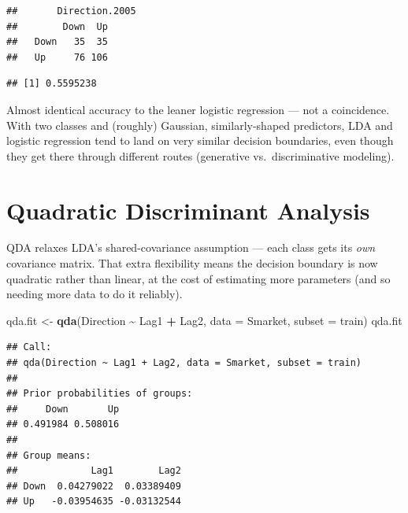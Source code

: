 \documentclass[
  11pt,
]{article}
\newenvironment{Shaded}{\begin{snugshade}}{\end{snugshade}}
\newcommand{\AttributeTok}[1]{\textcolor[rgb]{0.13,0.29,0.53}{#1}}
\newcommand{\FloatTok}[1]{\textcolor[rgb]{0.00,0.00,0.81}{#1}}
\newcommand{\FunctionTok}[1]{\textcolor[rgb]{0.13,0.29,0.53}{\textbf{#1}}}
\newcommand{\NormalTok}[1]{#1}
\newcommand{\OtherTok}[1]{\textcolor[rgb]{0.56,0.35,0.01}{#1}}
\newcommand{\SpecialCharTok}[1]{\textcolor[rgb]{0.81,0.36,0.00}{\textbf{#1}}}
\begin{document}
\begin{verbatim}
##       Direction.2005
##        Down  Up
##   Down   35  35
##   Up     76 106
\end{verbatim}

\begin{Shaded}
\end{Shaded}

\begin{verbatim}
## [1] 0.5595238
\end{verbatim}

Almost identical accuracy to the leaner logistic regression --- not a
coincidence. With two classes and (roughly) Gaussian, similarly-shaped
predictors, LDA and logistic regression tend to land on very similar
decision boundaries, even though they get there through different routes
(generative vs.~discriminative modeling).

\section{Quadratic Discriminant
Analysis}\label{quadratic-discriminant-analysis}

QDA relaxes LDA's shared-covariance assumption --- each class gets its
\emph{own} covariance matrix. That extra flexibility means the decision
boundary is now quadratic rather than linear, at the cost of estimating
more parameters (and so needing more data to do it reliably).

\begin{Shaded}
\begin{Highlighting}[]
\NormalTok{qda.fit }\OtherTok{\textless{}{-}} \FunctionTok{qda}\NormalTok{(Direction }\SpecialCharTok{\textasciitilde{}}\NormalTok{ Lag1 }\SpecialCharTok{+}\NormalTok{ Lag2, }\AttributeTok{data =}\NormalTok{ Smarket, }\AttributeTok{subset =}\NormalTok{ train)}
\NormalTok{qda.fit}
\end{Highlighting}
\end{Shaded}

\begin{verbatim}
## Call:
## qda(Direction ~ Lag1 + Lag2, data = Smarket, subset = train)
## 
## Prior probabilities of groups:
##     Down       Up 
## 0.491984 0.508016 
## 
## Group means:
##             Lag1        Lag2
## Down  0.04279022  0.03389409
## Up   -0.03954635 -0.03132544
\end{verbatim}
\end{document}
